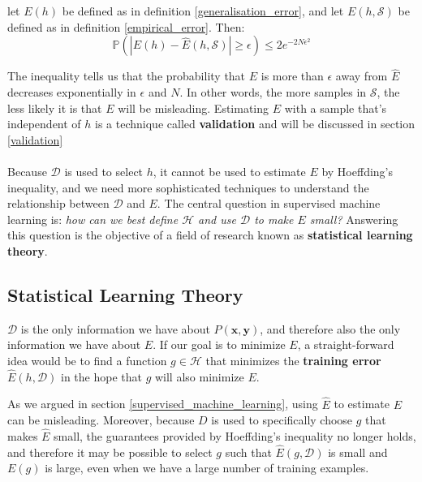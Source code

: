 \begin{theorem}
	let $E(h)$ be defined as in definition \ref{generalisation_error}, and let $E(h, \mathcal{S})$ be defined as in definition \ref{empirical_error}. Then:
	$$
	\mathbb{P}\left( |E(h) - \hat{E}(h, \mathcal{S})| \geq \epsilon \right) \leq 2e^{-2N\epsilon^2}
	$$
\end{theorem}

The inequality tells us that the probability that $E$ is more than $\epsilon$ away from $\hat{E}$ decreases exponentially in $\epsilon$ and $N$. In other words, the more samples in $\mathcal{S}$, the less likely it is that $E$ will be misleading. Estimating $E$ with a sample that's independent of $h$ is a technique called \textbf{validation} and will be discussed in section \ref{validation}
\\\\
Because $\mathcal{D}$ is used to select $h$, it cannot be used to estimate $E$ by Hoeffding's inequality, and we need more sophisticated techniques to understand the relationship between $\mathcal{D}$ and $E$. The central question in supervised machine learning is: \textit{how can we best define $\mathcal{H}$ and use $\mathcal{D}$ to make $E$ small?} Answering this question is the objective of a field of research known as \textbf{statistical learning theory}.

\subsection{Statistical Learning Theory}
\label{statistical_learning_theory}
$\mathcal{D}$ is the only information we have about $P(\mathbf{x}, \mathbf{y})$, and therefore also the only information we have about $E$. If our goal is to minimize $E$, a straight-forward idea would be to find a function $g \in \mathcal{H}$ that minimizes the \textbf{training error} $\hat{E}(h, \mathcal{D})$ in the hope that $g$ will also minimize $E$. 

As we argued in section \ref{supervised_machine_learning}, using $\hat{E}$ to estimate $E$ can be misleading. Moreover, because $D$ is used to specifically choose $g$ that makes $\hat{E}$ small, the guarantees provided by Hoeffding's inequality no longer holds, and therefore it may be possible to select $g$ such that $\hat{E}(g, \mathcal{D})$ is small and $E(g)$ is large, even when we have a large number of training examples.


